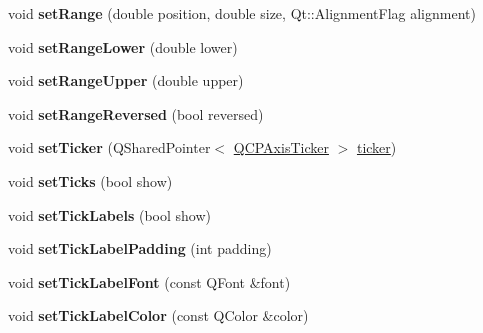 \begin{DoxyCompactItemize}
\item 
void {\bfseries set\+Range} (double position, double size, Qt\+::\+Alignment\+Flag alignment)\hypertarget{class_q_c_p_axis_acf60e5b2d631fbc8c4548c3d579cb6d0}{}\label{class_q_c_p_axis_acf60e5b2d631fbc8c4548c3d579cb6d0}

\item 
void {\bfseries set\+Range\+Lower} (double lower)\hypertarget{class_q_c_p_axis_afcf51227d337db28d1a9ce9a4d1bc91a}{}\label{class_q_c_p_axis_afcf51227d337db28d1a9ce9a4d1bc91a}

\item 
void {\bfseries set\+Range\+Upper} (double upper)\hypertarget{class_q_c_p_axis_acd3ca1247aa867b540cd5ec30ccd3bef}{}\label{class_q_c_p_axis_acd3ca1247aa867b540cd5ec30ccd3bef}

\item 
void {\bfseries set\+Range\+Reversed} (bool reversed)\hypertarget{class_q_c_p_axis_a2172fdb196b1a0dc3f40992fcad8e9e1}{}\label{class_q_c_p_axis_a2172fdb196b1a0dc3f40992fcad8e9e1}

\item 
void {\bfseries set\+Ticker} (Q\+Shared\+Pointer$<$ \hyperlink{class_q_c_p_axis_ticker}{Q\+C\+P\+Axis\+Ticker} $>$ \hyperlink{class_q_c_p_axis_acdd672979a52b1f31e2da3518c92616d}{ticker})\hypertarget{class_q_c_p_axis_a4ee03fcd2c74d05cd1a419b9af5cfbdc}{}\label{class_q_c_p_axis_a4ee03fcd2c74d05cd1a419b9af5cfbdc}

\item 
void {\bfseries set\+Ticks} (bool show)\hypertarget{class_q_c_p_axis_ac891409315bc379e3b1abdb162c1a011}{}\label{class_q_c_p_axis_ac891409315bc379e3b1abdb162c1a011}

\item 
void {\bfseries set\+Tick\+Labels} (bool show)\hypertarget{class_q_c_p_axis_a04ba16e1f6f78d70f938519576ed32c8}{}\label{class_q_c_p_axis_a04ba16e1f6f78d70f938519576ed32c8}

\item 
void {\bfseries set\+Tick\+Label\+Padding} (int padding)\hypertarget{class_q_c_p_axis_af302c479af9dbc2e9f0e44e07c0012ee}{}\label{class_q_c_p_axis_af302c479af9dbc2e9f0e44e07c0012ee}

\item 
void {\bfseries set\+Tick\+Label\+Font} (const Q\+Font \&font)\hypertarget{class_q_c_p_axis_a2b8690c4e8dbc39d9185d2b398ce7a6c}{}\label{class_q_c_p_axis_a2b8690c4e8dbc39d9185d2b398ce7a6c}

\item 
void {\bfseries set\+Tick\+Label\+Color} (const Q\+Color \&color)\hypertarget{class_q_c_p_axis_a395e445c3fe496b935bee7b911ecfd1c}{}\label{class_q_c_p_axis_a395e445c3fe496b935bee7b911ecfd1c}


\end{DoxyCompactItemize}
